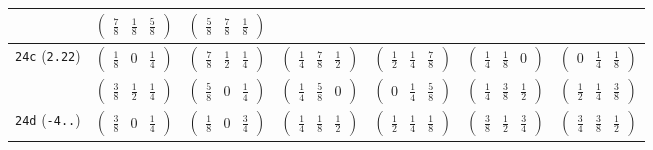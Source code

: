 \documentclass[fleqn,9pt,landscape]{jsarticle}
\begin{document}
\begin{center}
\begin{longtable}{ccccccc}
& $ \begin{pmatrix} \frac{7}{8} & \frac{1}{8} & \frac{5}{8} \end{pmatrix} $ & $ \begin{pmatrix} \frac{5}{8} & \frac{7}{8} & \frac{1}{8} \end{pmatrix} $ & $  $ & $  $ & $  $ & $  $ \\ \hline
{\tt 24c} ({\tt 2.22}) & $ \begin{pmatrix} \frac{1}{8} & 0 & \frac{1}{4} \end{pmatrix} $ & $ \begin{pmatrix} \frac{7}{8} & \frac{1}{2} & \frac{1}{4} \end{pmatrix} $ & $ \begin{pmatrix} \frac{1}{4} & \frac{7}{8} & \frac{1}{2} \end{pmatrix} $ & $ \begin{pmatrix} \frac{1}{2} & \frac{1}{4} & \frac{7}{8} \end{pmatrix} $ & $ \begin{pmatrix} \frac{1}{4} & \frac{1}{8} & 0 \end{pmatrix} $ & $ \begin{pmatrix} 0 & \frac{1}{4} & \frac{1}{8} \end{pmatrix} $ \\
& $ \begin{pmatrix} \frac{3}{8} & \frac{1}{2} & \frac{1}{4} \end{pmatrix} $ & $ \begin{pmatrix} \frac{5}{8} & 0 & \frac{1}{4} \end{pmatrix} $ & $ \begin{pmatrix} \frac{1}{4} & \frac{5}{8} & 0 \end{pmatrix} $ & $ \begin{pmatrix} 0 & \frac{1}{4} & \frac{5}{8} \end{pmatrix} $ & $ \begin{pmatrix} \frac{1}{4} & \frac{3}{8} & \frac{1}{2} \end{pmatrix} $ & $ \begin{pmatrix} \frac{1}{2} & \frac{1}{4} & \frac{3}{8} \end{pmatrix} $ \\ \hline
{\tt 24d} ({\tt -4..}) & $ \begin{pmatrix} \frac{3}{8} & 0 & \frac{1}{4} \end{pmatrix} $ & $ \begin{pmatrix} \frac{1}{8} & 0 & \frac{3}{4} \end{pmatrix} $ & $ \begin{pmatrix} \frac{1}{4} & \frac{1}{8} & \frac{1}{2} \end{pmatrix} $ & $ \begin{pmatrix} \frac{1}{2} & \frac{1}{4} & \frac{1}{8} \end{pmatrix} $ & $ \begin{pmatrix} \frac{3}{8} & \frac{1}{2} & \frac{3}{4} \end{pmatrix} $ & $ \begin{pmatrix} \frac{3}{4} & \frac{3}{8} & \frac{1}{2} \end{pmatrix} $ \\

\end{longtable}
\end{center}
\end{document}
